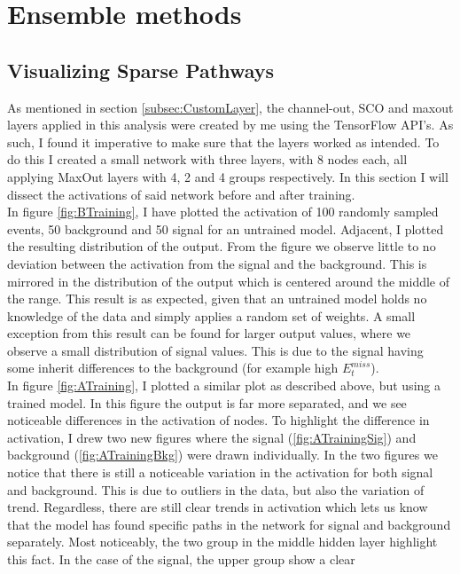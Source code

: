 \section{Ensemble methods}\label{sec:Ensemble}
\subsection{Visualizing Sparse Pathways}\label{subsec:Viz}
As mentioned in section \ref{subsec:CustomLayer}, the channel-out, \ac{SCO} and maxout layers applied in this 
analysis were created by me using the TensorFlow \ac{API}'s. As such, I found it imperative to make
sure that the layers worked as intended. To do this I created a small network with three layers, with 8 
nodes each, all applying MaxOut layers with 4, 2 and 4 groups respectively. In this section I will 
dissect the activations of said network before and after training.
\\
In figure \ref{fig:BTraining}, I have plotted the activation of 100 randomly sampled events, 50 
background and 50 signal for an untrained model. Adjacent, I plotted the resulting distribution of the 
output. From the figure we observe little to no deviation between the activation from the signal and 
the background. This is mirrored in the distribution of the output which is centered around the middle 
of the range. This result is as expected, given that an untrained model holds no knowledge of the data and 
simply applies a random set of weights. A small exception from this result can be found for larger output values, 
where we observe a small distribution of signal values. This is due to the signal having some inherit differences
to the background (for example high $E_t^{miss}$).
\\
In figure \ref{fig:ATraining}, I plotted a similar plot as described above, but using a trained model.
In this figure the output is far more separated, and we see noticeable differences in the activation 
of nodes. To highlight the difference in activation, I drew two new figures where the signal 
(\ref{fig:ATrainingSig}) and background (\ref{fig:ATrainingBkg}) were drawn individually.
In the two figures we notice that there is still a noticeable variation in the activation for
both signal and background. This is due to outliers in the data, but also the variation of trend.
Regardless, there are still clear trends in activation which lets us know that the model has found 
specific paths in the network for signal and background separately. Most noticeably, the two group 
in the middle hidden layer highlight this fact. In the case of the signal, the upper group show a clear 
